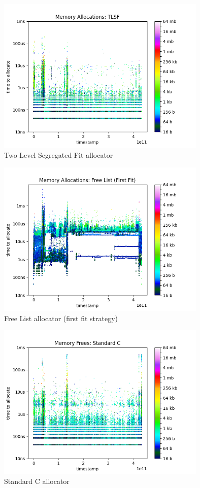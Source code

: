 \documentclass{article}
\begin{document}
\begin{figure}[h]
	\centering
	\includegraphics[width=10cm]{results_tlsf_alloc}
	\captionsetup{width=10cm}
	\caption{Two Level Segregated Fit allocator}
\end{figure}
\begin{figure}[h]
	\centering
	\includegraphics[width=10cm]{results_first_alloc}
	\captionsetup{width=10cm}
	\caption{Free List allocator (first fit strategy)}
\end{figure}
\begin{figure}[h]
	\centering
	\includegraphics[width=10cm]{results_vanilla_free}
	\captionsetup{width=10cm}
	\caption{Standard C allocator}
\end{figure}
\end{document}

